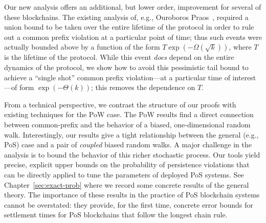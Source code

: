 Our new analysis offers an additional, but lower order, improvement for
several of these blockchains. The existing analysis of, e.g.,
Ouroboros Praos~\cite{DBLP:conf/eurocrypt/DavidGKR18}, required a
union bound to be taken over the entire lifetime of the protocol in
order to rule out a common prefix violation at a particular point of
time; thus such events were actually bounded above by a function of
the form $T \exp(-\Omega(\sqrt{k}))$, where $T$ is the lifetime of the
protocol. While this event \emph{does} depend on the entire dynamics
of the protocol, we show how to avoid this pessimistic tail bound to
achieve a ``single shot'' common prefix violation---at a particular
time of interest---of form $\exp(-\Theta(k))$; this removes the
dependence on $T$.

From a technical perspective, we contrast the structure of our proofs
with existing techniques for the PoW case. The PoW results find a
direct connection between common-prefix and the behavior of a biased,
one-dimensional random walk. Interestingly, our results give a tight
relationship between the general (e.g., PoS) case and a pair of
\emph{coupled} biased random walks. A major challenge in the analysis
is to bound the behavior of this richer stochastic process.  Our tools
yield precise, explicit upper bounds on the probability of persistence
violations that can be directly applied to tune the parameters of
deployed PoS systems. See Chapter~\ref{sec:exact-prob} where we
record some concrete results of the general theory. The importance of
these results in the practice of PoS blockchain systems cannot be
overstated: they provide, for the first time, concrete error bounds
for settlement times for PoS blockchains that follow the longest chain
rule.



